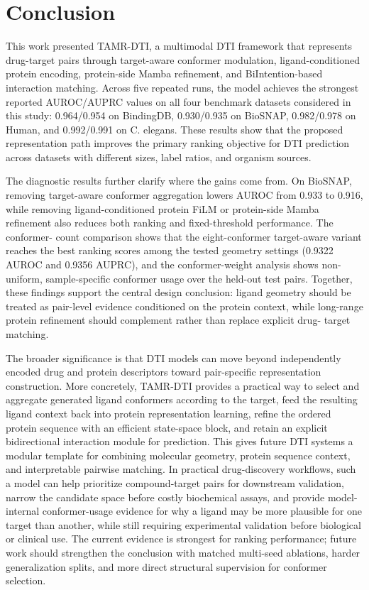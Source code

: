 \section{Conclusion}

This work presented TAMR-DTI, a multimodal DTI framework that represents drug-target pairs through
target-aware conformer modulation, ligand-conditioned protein encoding, protein-side Mamba refinement,
and BiIntention-based interaction matching. Across five repeated runs, the model achieves the strongest
reported AUROC/AUPRC values on all four benchmark datasets considered in this study: 0.964/0.954 on
BindingDB, 0.930/0.935 on BioSNAP, 0.982/0.978 on Human, and 0.992/0.991 on C. elegans. These results
show that the proposed representation path improves the primary ranking objective for DTI prediction across
datasets with different sizes, label ratios, and organism sources.

The diagnostic results further clarify where the gains come from. On BioSNAP, removing target-aware
conformer aggregation lowers AUROC from 0.933 to 0.916, while removing ligand-conditioned protein FiLM
or protein-side Mamba refinement also reduces both ranking and fixed-threshold performance. The conformer-
count comparison shows that the eight-conformer target-aware variant reaches the best ranking scores among
the tested geometry settings (0.9322 AUROC and 0.9356 AUPRC), and the conformer-weight analysis shows
non-uniform, sample-specific conformer usage over the held-out test pairs. Together, these findings support
the central design conclusion: ligand geometry should be treated as pair-level evidence conditioned on the
protein context, while long-range protein refinement should complement rather than replace explicit drug-
target matching.

The broader significance is that DTI models can move beyond independently encoded drug and protein
descriptors toward pair-specific representation construction. More concretely, TAMR-DTI provides a
practical way to select and aggregate generated ligand conformers according to the target, feed the resulting
ligand context back into protein representation learning, refine the ordered protein sequence with an
efficient state-space block, and retain an explicit bidirectional interaction module for prediction. This gives
future DTI systems a modular template for combining molecular geometry, protein sequence context, and
interpretable pairwise matching. In practical drug-discovery workflows, such a model can help prioritize
compound-target pairs for downstream validation, narrow the candidate space before costly biochemical
assays, and provide model-internal conformer-usage evidence for why a ligand may be more plausible for one
target than another, while still requiring experimental validation before biological or clinical use. The
current evidence is strongest for ranking performance; future work should strengthen the conclusion with
matched multi-seed ablations, harder generalization splits, and more direct structural supervision for conformer
selection.
